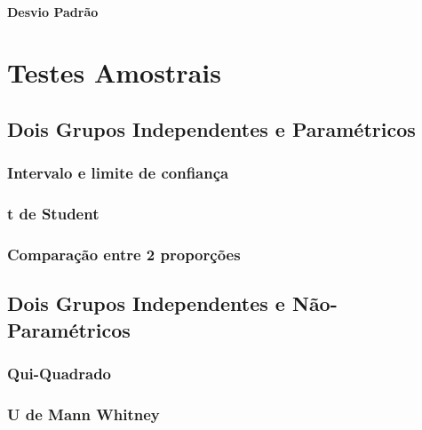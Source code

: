 \documentclass[
]{book}
\begin{document}
\hypertarget{desvio-padruxe3o}{%
\subsection{Desvio Padrão}\label{desvio-padruxe3o}}

\hypertarget{part-testes-amostrais}{%
\part{Testes Amostrais}\label{part-testes-amostrais}}

\hypertarget{dois-grupos-independentes-e-paramuxe9tricos}{%
\chapter{Dois Grupos Independentes e Paramétricos}\label{dois-grupos-independentes-e-paramuxe9tricos}}

\hypertarget{intervalo-e-limite-de-confianuxe7a}{%
\section{Intervalo e limite de confiança}\label{intervalo-e-limite-de-confianuxe7a}}

\hypertarget{t-de-student}{%
\section{t de Student}\label{t-de-student}}

\hypertarget{comparauxe7uxe3o-entre-2-proporuxe7uxf5es}{%
\section{Comparação entre 2 proporções}\label{comparauxe7uxe3o-entre-2-proporuxe7uxf5es}}

\hypertarget{dois-grupos-independentes-e-nuxe3o-paramuxe9tricos}{%
\chapter{Dois Grupos Independentes e Não-Paramétricos}\label{dois-grupos-independentes-e-nuxe3o-paramuxe9tricos}}

\hypertarget{qui-quadrado}{%
\section{Qui-Quadrado}\label{qui-quadrado}}

\hypertarget{u-de-mann-whitney}{%
\section{U de Mann Whitney}\label{u-de-mann-whitney}}
\end{document}

